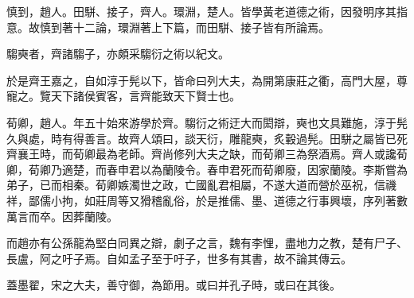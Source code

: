 慎到，趙人。田駢、接子，齊人。環淵，楚人。皆學黃老道德之術，因發明序其指意。故慎到著十二論，環淵著上下篇，而田駢、接子皆有所論焉。

騶奭者，齊諸騶子，亦頗采騶衍之術以紀文。

於是齊王嘉之，自如淳于髡以下，皆命曰列大夫，為開第康莊之衢，高門大屋，尊寵之。覽天下諸侯賓客，言齊能致天下賢士也。

荀卿，趙人。年五十始來游學於齊。騶衍之術迂大而閎辯，奭也文具難施，淳于髡久與處，時有得善言。故齊人頌曰，談天衍，雕龍奭，炙轂過髡。田駢之屬皆已死齊襄王時，而荀卿最為老師。齊尚修列大夫之缺，而荀卿三為祭酒焉。齊人或讒荀卿，荀卿乃適楚，而春申君以為蘭陵令。春申君死而荀卿廢，因家蘭陵。李斯嘗為弟子，已而相秦。荀卿嫉濁世之政，亡國亂君相屬，不遂大道而營於巫祝，信禨祥，鄙儒小拘，如莊周等又猾稽亂俗，於是推儒、墨、道德之行事興壞，序列著數萬言而卒。因葬蘭陵。

而趙亦有公孫龍為堅白同異之辯，劇子之言，魏有李悝，盡地力之教，楚有尸子、長盧，阿之吁子焉。自如孟子至于吁子，世多有其書，故不論其傳云。

蓋墨翟，宋之大夫，善守御，為節用。或曰并孔子時，或曰在其後。